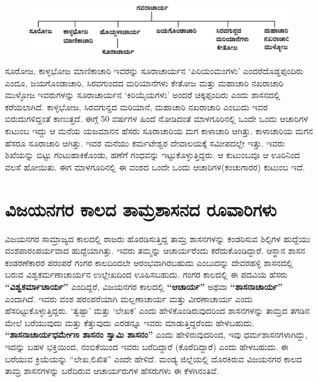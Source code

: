 \begin{figure}[!h]
\includegraphics[scale=.92]{images/chap5/chap5fig4.jpeg}
\end{figure}

ಸೂರೋಜ, ಕಾಳ್ಳಭೋಜ ಮಾಣಿಕಾಚಾರಿ ಇವರನ್ನು ಸೂರಾಚಾರ್ಯನ ‘ಪಿರಿಯಂಮಂಗಳು’ ಎಂದರೆ\break ದೊಡ್ಡಪ್ಪಂದಿರು ಎಂದೂ, ಜಯಗೊಂಡಾಚಾರಿ, ಸಿರವಗುಂದದ ಮರಿಯಾನೆಗಳು ಕೇತೋಜ ಮತ್ತು ಮಹಾಚಾರಿ ನಖರಾಚಾರಿ ಮುಳ್ಳೋಜ ಇವರುಗಳನ್ನು ಸೂರಾಚಾರ್ಯನ ‘ಕಿರಿಯೈಯಗಳು’ ಅಂದರೆ ಚಿಕ್ಕಪ್ಪಂದಿರು ಎಂದು ಶಾಸನದಲ್ಲಿ ಕರೆಯಲಾಗಿದೆ. ಕಾಳ್ಳಭೋಜ, ಸಿರವಗುನ್ದದ ಮರಿಯಾನೆ, ಮಹಾಚಾರಿ ನಖರಾಚಾರಿ ಎಂಬುದು ಇವರ ಬಿರುದುಗಳಿದ್ದಂತೆ ಕಾಣುತ್ತದೆ. ಈಗ್ಗೆ 50 ವರ್ಷಗಳ ಹಿಂದೆ ನೋಡಿದಂತೆ ಮಾಳಗೂರಿನಲ್ಲಿ ಒಂದೇ ಒಂದು ಆಚಾರಿಗಳ ಕುಟುಂಬ ಇದ್ದು ಆ ಮನೆಯ ಯಜಮಾನನ ಹೆಸರು ಸೂರಾಚಾರಿಯ ಮಗ ಕಾಳಾಚಾರಿ ಆಗಿತ್ತು. ಕಾಳಾಚಾರಿಯ ಮಗನ ಹೆಸರೂ ಸೂರಾಚಾರಿ ಆಗಿತ್ತು. ಇವರ ಮನೆಯು ಕರ್ಮಟೇಶ್ವರ ದೇವಾಲಯಕ್ಕೆ ಸಮೀಪದಲ್ಲೇ ಇತ್ತು. ಇವರು ಶಿಖೆಯನ್ನು ಬಿಟ್ಟು ಗಂಟುಹಾಕಿಕೊಂಡು, ಹಣೆಗೆ ಗಂಧವನ್ನು ಇಟ್ಟುಕೊಳ್ಳುತ್ತಿದ್ದರು. ಆ ಕುಟುಂಬವೂ ಆ ಊರಿನಿಂದ ವಲಸೆ ಹೋಯಿತು. ಈಗ ಮಾಳಗೂರಿನಲ್ಲಿ ಈ ವಂಶದ ಒಂದೇ ಒಂದು ಆಚಾರಿಗಳ(ಕಂಚುಗಾರರ) ಕುಟುಂಬ ಇದೆ.


\section{ವಿಜಯನಗರ ಕಾಲದ ತಾಮ್ರಶಾಸನದ ರೂವಾರಿಗಳು}

\vskip -3pt

ವಿಜಯನಗರ ಸಾಮ್ರಾಜ್ಯದ ಕಾಲದಲ್ಲಿ ರಾಜರು ಹೊರಡಿಸುತ್ತಿದ್ದ ತಾಮ್ರ ಶಾಸನಗಳನ್ನು ಕಂಡರಿಸುವ ಶಿಲ್ಪಿಗಳ ಹುದ್ದೆಯು ವಂಶಪಾರಂಪರ್ಯವಾದ ಹುದ್ದೆಯಾಗಿತ್ತು. ಇವರು ತಮ್ಮನ್ನು ಆಚಾರ್ಯರೆಂದು ಕರೆದುಕೊಂಡಿದ್ದಾರೆ. ಆಸ್ಥಾನ ಶಾಸನ ಕಂಡರಣೆಕಾರರ ಪರಂಪರೆ ಗಂಗರ ಕಾಲದಿಂದಲೇ ಆರಂಭವಾಗಿರಬಹುದು ಎಂಬುದನ್ನು ದೇವರಹಳ್ಳಿ ಶಾಸನದಲ್ಲಿ ಬರುವ ವಿಶ್ವಕರ್ಮಣಾಚಾರ್ಯನ ಉಲ್ಲೇಖದಿಂದ ಊಹಿಸಬಹುದು. ಗಂಗರ ಕಾಲದಲ್ಲಿ ಈ ಪದವಿಯ ಹೆಸರು \textbf{“ವಿಶ್ವಕರ್ಮಾಚಾರ್ಯ”} ಎಂದಿದ್ದರೆ, ವಿಜಯನಗರ ಕಾಲದಲ್ಲಿ \textbf{“ಆಚಾರ್ಯ” }ಅಥವಾ \textbf{“ಶಾಸನಾಚಾರ್ಯ” }ಎಂದಾಗಿದೆ. ಇವರು ವಂಶ ಪರಂಪರೆಯಾಗಿ ಮಲ್ಲಣಾಚಾರ್ಯ ಮತ್ತು ವೀರಣಾಚಾರ್ಯ ಎಂದು ಹೆಸರಿಟ್ಟುಕೊಳ್ಳುತ್ತಿದ್ದರು. ‘ತ್ವಷ್ಟಾ’ ಮತ್ತು ‘ಲೇಖಕ’ ಎಂದು ಹೇಳಿಕೊಂಡಿರುವುದರಿಂದ ಶಾಸನಗಳನ್ನು ತಾಮ್ರದ ತಗಡಿನ ಮೇಲೆ ಬರೆಯುವುದು ಮತ್ತು ಕೆತ್ತುವುದು ಎರಡನ್ನೂ ಇವರು ಮಾಡುತ್ತಿದ್ದರೆಂದು ಹೇಳಬಹುದು. \textbf{“ಶಾಸನಾಚಾರ್ಯಧರ್ಮೇಣ ಶಾಸನಂ ಸ್ವಾಮಿ ಶಾಸನಂ”} ಎಂದು ಹೇಳಿರುವುದರಿಂದ, ಇವು ಧರ್ಮಶಾಸನಗಳಾಗಿದ್ದು, ಇದನ್ನು ಬಹಳ ಭಕ್ತಿಯಿಂದ, ನಂಬಿಕೆಯಿಂದ ಇವರು ಬರೆದಿದ್ದಾರೆ (ಕೊರೆದಿದ್ದಾರೆ) ಎಂದು ಹೇಳಬಹುದು. ಈ ಬರೆಯುವ ಕ್ರಿಯೆಯನ್ನು “ಲೇಖ,ಲಿಖಿತ” ಎಂದೇ ಹೇಳಿದೆ. ಮಂಡ್ಯ ಜಿಲ್ಲೆಯಲ್ಲಿ ದೊರಕಿರುವ ವಿಜಯನಗರ ಕಾಲದ ತಾಮ್ರ ಶಾಸನಗಳನ್ನು ಬರೆದಿರುವ ಆಚಾರ್ಯರುಗಳ ಹೆಸರುಗಳು ಈ ಕೆಳಗಿನಂತಿವೆ.

